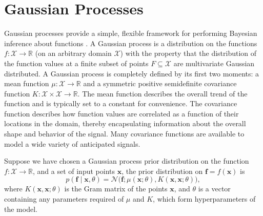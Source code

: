 \documentclass{article} %
\newcommand{\R}{\ensuremath{\mathbb{R}}}
\newcommand{\deq}{=}
\newcommand{\given}{\!\ensuremath{\mid}\!}
\newcommand{\cm}[1]{\ensuremath{\mathcal{#1}}}
\newcommand{\bm}[1]{\ensuremath{\mathbf{#1}}}
\begin{document}
% 
% 

\section{Gaussian Processes}

Gaussian processes provide a simple, flexible framework for performing
Bayesian inference about functions \citep{gpml}.  A Gaussian process
is a distribution on the functions $f\colon \cm{X} \to \R$ (on an
arbitrary domain $\cm{X}$) with the property that the distribution of
the function values at a finite subset of points $F \subseteq \cm{X}$
are multivariate Gaussian distributed. A Gaussian process is completely defined by its first two moments: a
mean function $\mu\colon \cm{X} \to \R$ and a symmetric positive
semidefinite covariance function $K\colon \cm{X} \times \cm{X} \to
\R$.  The mean function describes the overall trend of the function
and is typically set to a constant for convenience.  The covariance
function describes how function values are correlated as a function of
their locations in the domain, thereby encapsulating information about
the overall shape and behavior of the signal.  Many covariance
functions are available to model a wide variety of anticipated
signals.

Suppose we have chosen a Gaussian process prior distribution on the
function $f\colon \cm{X} \to \R$, and a set of input points $\bm{x}$,
the prior distribution on $\bm{f} \deq f(\bm{x})$ is
\begin{equation*}
 p(\bm{f} \given \bm{x}, \theta)
 =
 \cm{N}
 \bigl(
   \bm{f};
   \mu(\bm{x}; \theta),
   K(\bm{x}, \bm{x}; \theta)
 \bigr),
\end{equation*}
where $K(\bm{x}, \bm{x}; \theta)$ is the Gram matrix of the points
$\bm{x}$, and $\theta$ is a vector containing any parameters required
of $\mu$ and $K$, which form hyperparameters of the model.
\end{document}

